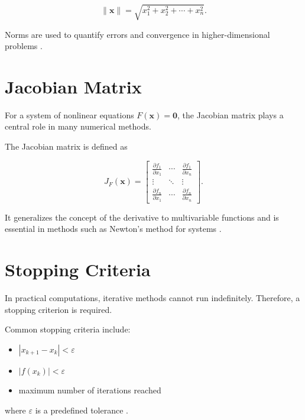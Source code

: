 \begin{equation}
\|\mathbf{x}\| = \sqrt{x_1^2 + x_2^2 + \cdots + x_n^2}.
\end{equation}

Norms are used to quantify errors and convergence in higher-dimensional problems \cite{atkinson}.

\section{Jacobian Matrix}

For a system of nonlinear equations \( F(\mathbf{x}) = \mathbf{0} \), the Jacobian matrix plays a central role in many numerical methods.

The Jacobian matrix is defined as

\begin{equation}
J_F(\mathbf{x}) =
\begin{bmatrix}
\frac{\partial f_1}{\partial x_1} & \cdots & \frac{\partial f_1}{\partial x_n} \\
\vdots & \ddots & \vdots \\
\frac{\partial f_n}{\partial x_1} & \cdots & \frac{\partial f_n}{\partial x_n}
\end{bmatrix}.
\end{equation}

It generalizes the concept of the derivative to multivariable functions and is essential in methods such as Newton’s method for systems \cite{kelley}.

\section{Stopping Criteria}

In practical computations, iterative methods cannot run indefinitely. Therefore, a stopping criterion is required.

Common stopping criteria include:
\begin{itemize}
    \item \( |x_{k+1} - x_k| < \varepsilon \)
    \item \( |f(x_k)| < \varepsilon \)
    \item maximum number of iterations reached
\end{itemize}

where \( \varepsilon \) is a predefined tolerance \cite{burden, cs357}.